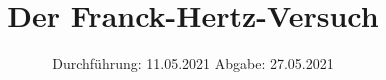 

\subject{V601}
\title{Der Franck-Hertz-Versuch}
\date{%
  Durchführung: 11.05.2021
  \hspace{3em}
  Abgabe: 27.05.2021
}



\maketitle
\thispagestyle{empty}
\tableofcontents
\newpage







\printbibliography{}


